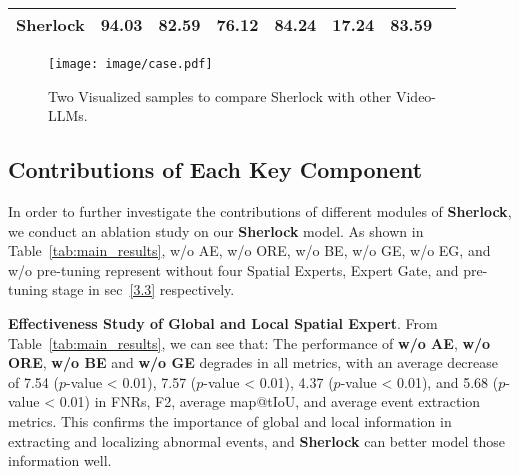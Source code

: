 \begin{table}[]
{\begin{tabular}{c|cccc|ccc}
\rowcolor{lightpink} \textbf{Sherlock}          & {\color[HTML]{3166FF} \textbf{94.03}} & {\color[HTML]{3166FF} \textbf{82.59}} & {\color[HTML]{3166FF} \textbf{76.12}} & {\color[HTML]{3166FF} \textbf{84.24}} & {\color[HTML]{3166FF} \textbf{17.24}} & {\color[HTML]{3166FF} \textbf{83.59}} \\ \hline
\end{tabular}}
\label{tab:plm}
\end{table}


\begin{figure*}[t]
\vspace{-0.3cm}
\setlength{\abovecaptionskip}{0.5 ex}
\setlength{\belowcaptionskip}{-3 ex}
  \centering
  \texttt{[image: image/case.pdf]}
  \caption{Two Visualized samples to compare Sherlock with other Video-LLMs.}
  \label{fig:casestudy}
\end{figure*}

\subsection{Contributions of Each Key Component}
In order to further investigate the contributions of different modules of \textbf{Sherlock}, we conduct an ablation study on our \textbf{Sherlock} model. As shown in Table~\ref{tab:main_results}, w/o AE, w/o ORE, w/o BE, w/o GE, w/o EG, and w/o pre-tuning represent without four Spatial Experts, Expert Gate, and pre-tuning stage in sec~\ref{3.3} respectively.








\textbf{Effectiveness Study of Global and Local Spatial Expert}. From Table~\ref{tab:main_results}, we can see that: The performance of \textbf{w/o AE}, \textbf{w/o ORE}, \textbf{w/o BE} and \textbf{w/o GE} degrades in all metrics, with an average decrease of 7.54 ($p$-value < 0.01), 7.57 ($p$-value < 0.01), 4.37 ($p$-value < 0.01), and 5.68 ($p$-value < 0.01) in FNRs, F2, average map@tIoU, and average event extraction metrics. This confirms the importance of global and local information in extracting and localizing abnormal events, and \textbf{Sherlock} can better model those information well.



